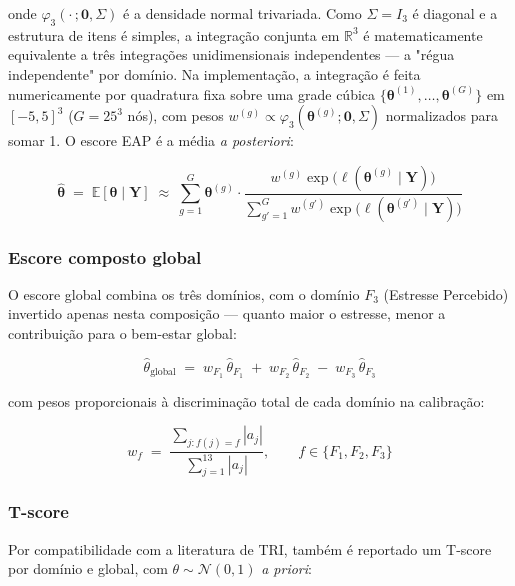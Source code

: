 \documentclass[12pt,a4paper]{article}
\begin{document}
onde $\varphi_3(\cdot\,;\mathbf{0},\Sigma)$ é a densidade normal trivariada.
Como $\Sigma = I_3$ é diagonal e a estrutura de itens é simples, a
integração conjunta em $\mathbb{R}^3$ é matematicamente equivalente a três
integrações unidimensionais independentes — a "régua independente" por
domínio. Na implementação, a integração é feita numericamente por
quadratura fixa sobre uma grade cúbica
$\{\boldsymbol{\theta}^{(1)}, \dots, \boldsymbol{\theta}^{(G)}\}$ em
$[-5,5]^3$ ($G = 25^3$ nós), com pesos $w^{(g)} \propto
\varphi_3(\boldsymbol{\theta}^{(g)};\mathbf{0},\Sigma)$ normalizados para
somar 1. O escore EAP é a média \emph{a posteriori}:

\begin{equation}
\hat{\boldsymbol{\theta}} \;=\; \mathbb{E}[\boldsymbol{\theta} \mid \mathbf{Y}]
\;\approx\; \sum_{g=1}^{G} \boldsymbol{\theta}^{(g)} \cdot
\frac{w^{(g)} \exp\big(\ell(\boldsymbol{\theta}^{(g)}\mid\mathbf{Y})\big)}
{\sum_{g'=1}^{G} w^{(g')} \exp\big(\ell(\boldsymbol{\theta}^{(g')}\mid\mathbf{Y})\big)}
\label{eq:medqol-eap}
\end{equation}

\subsubsection{Escore composto global}

O escore global combina os três domínios, com o domínio $F_3$ (Estresse
Percebido) invertido apenas nesta composição — quanto maior o estresse, menor
a contribuição para o bem-estar global:

\begin{equation}
\hat\theta_{\text{global}} \;=\; w_{F_1}\,\hat\theta_{F_1} \;+\; w_{F_2}\,\hat\theta_{F_2} \;-\; w_{F_3}\,\hat\theta_{F_3}
\label{eq:medqol-global-theta}
\end{equation}

com pesos proporcionais à discriminação total de cada domínio na
calibração:

\begin{equation}
w_f \;=\; \frac{\sum_{j : f(j)=f} |a_j|}{\sum_{j=1}^{13} |a_j|}, \qquad f \in \{F_1,F_2,F_3\}
\label{eq:medqol-weights}
\end{equation}

\subsubsection{T-score}

Por compatibilidade com a literatura de TRI, também é reportado um T-score
por domínio e global, com $\theta \sim \mathcal{N}(0,1)$ \emph{a priori}:
\end{document}
